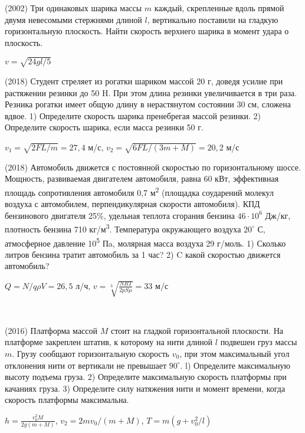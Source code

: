 \begin{ex}
(2002) Три одинаковых шарика массы $m$ каждый, скрепленные вдоль прямой двумя невесомыми стержнями длиной $l$, вертикально поставили на гладкую горизонтальную плоскость. Найти скорость верхнего шарика в момент удара о плоскость.
\begin{ans}
$v = \sqrt{24gl/5}$
\end{ans}
\end{ex}

\begin{ex}
(2018) Студент стреляет из рогатки шариком массой 20 г, доведя усилие при растяжении резинки до 50 H. При этом длина резинки увеличивается в три раза. Резника рогатки имеет общую длину в нерастянутом состоянии 30 см, сложена вдвое. 1) Определите скорость шарика пренебрегая массой резинки. 2) Определите скорость шарика, если масса резинки 50 г.
\begin{ans}
$v_1 = \sqrt{2FL/m}=27,4$ м/с, $v_2 = \sqrt{6FL/(3m+M)} = 20,2$ м/с
\end{ans}
\end{ex}

\begin{ex}
(2018) Автомобиль движется с постоянной скоростью по горизонтальному шоссе. Мощность, развиваемая двигателем
автомобиля, равна 60 кВт, эффективная площадь сопротивления автомобиля 0,7 м\textsuperscript{2} (площадка соударений молекул воздуха с автомобилем, перпендикулярная скорости автомобиля). КПД бензинового двигателя 25\%, удельная теплота сгорания бензина $46 \cdot 10^6$ Дж/кг, плотность бензина 710 кг/м\textsuperscript{3}. Температура окружающего воздуха $20^{\circ}$ С, атмосферное давление 10\textsuperscript{5} Пa, молярная масса воздуха 29 г/моль. 1) Сколько литров бензина тратит автомобиль за 1 час? 2) C какой скоростью движется автомобиль?
\begin{ans}
$Q = N/q \rho V = 26,5$ л/ч,  $v=\sqrt[3]{\frac{NRT}{2pS\mu}}=33$ м/с
\end{ans}
\end{ex}

\begin{ex}
\hspace{0pt} \\
\begin{minipage}{.65\textwidth}
(2016) Платформа массой $M$ стоит на гладкой горизонтальной плоскости. На платформе закреплен штатив, к которому на нити длиной $l$ подвешен груз массы $m$. Грузу сообщают горизонтальную скорость $v_0$, при этом максимальный угол отклонения нити от вертикали не превышает $90^{\circ}$. l) Определите максимальную высоту подъема груза. 2) Определите максимальную скорость платформы при качаниях груза. 3) Определите силу натяжения нити и момент времени, когда скорость платформы максимальна.
\end{minipage}
\begin{minipage}{.35\textwidth}
\centering

\end{minipage}
\begin{ans}
$h= \frac{v_0^2 M}{2g(m+M)}$, $v_2 = 2mv_0/(m+M)$, $T=m(g+v_0^2/l)$
\end{ans}
\end{ex}